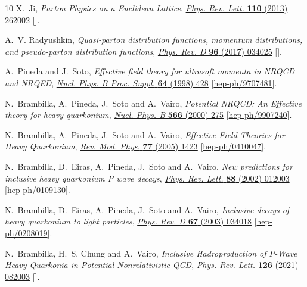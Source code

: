 \begin{thebibliography}{10}
X.~Ji, \emph{{Parton Physics on a Euclidean Lattice}},
  \href{https://doi.org/10.1103/PhysRevLett.110.262002}{\emph{Phys. Rev. Lett.}
  {\bfseries 110} (2013) 262002}
  [\href{https://arxiv.org/abs/1305.1539}{{}}].

A.~V. Radyushkin, \emph{{Quasi-parton distribution functions, momentum
  distributions, and pseudo-parton distribution functions}},
  \href{https://doi.org/10.1103/PhysRevD.96.034025}{\emph{Phys. Rev. D}
  {\bfseries 96} (2017) 034025}
  [\href{https://arxiv.org/abs/1705.01488}{{}}].

A.~Pineda and J.~Soto, \emph{{Effective field theory for ultrasoft momenta in
  NRQCD and NRQED}},
  \href{https://doi.org/10.1016/S0920-5632(97)01102-X}{\emph{Nucl. Phys. B
  Proc. Suppl.} {\bfseries 64} (1998) 428}
  [\href{https://arxiv.org/abs/hep-ph/9707481}{{\ttfamily hep-ph/9707481}}].

N.~Brambilla, A.~Pineda, J.~Soto and A.~Vairo, \emph{{Potential NRQCD: An
  Effective theory for heavy quarkonium}},
  \href{https://doi.org/10.1016/S0550-3213(99)00693-8}{\emph{Nucl. Phys. B}
  {\bfseries 566} (2000) 275}
  [\href{https://arxiv.org/abs/hep-ph/9907240}{{\ttfamily hep-ph/9907240}}].

N.~Brambilla, A.~Pineda, J.~Soto and A.~Vairo, \emph{{Effective Field Theories
  for Heavy Quarkonium}},
  \href{https://doi.org/10.1103/RevModPhys.77.1423}{\emph{Rev. Mod. Phys.}
  {\bfseries 77} (2005) 1423}
  [\href{https://arxiv.org/abs/hep-ph/0410047}{{\ttfamily hep-ph/0410047}}].

N.~Brambilla, D.~Eiras, A.~Pineda, J.~Soto and A.~Vairo, \emph{{New predictions
  for inclusive heavy quarkonium P wave decays}},
  \href{https://doi.org/10.1103/PhysRevLett.88.012003}{\emph{Phys. Rev. Lett.}
  {\bfseries 88} (2002) 012003}
  [\href{https://arxiv.org/abs/hep-ph/0109130}{{\ttfamily hep-ph/0109130}}].

N.~Brambilla, D.~Eiras, A.~Pineda, J.~Soto and A.~Vairo, \emph{{Inclusive
  decays of heavy quarkonium to light particles}},
  \href{https://doi.org/10.1103/PhysRevD.67.034018}{\emph{Phys. Rev. D}
  {\bfseries 67} (2003) 034018}
  [\href{https://arxiv.org/abs/hep-ph/0208019}{{\ttfamily hep-ph/0208019}}].

N.~Brambilla, H.~S. Chung and A.~Vairo, \emph{{Inclusive Hadroproduction of
  $P$-Wave Heavy Quarkonia in Potential Nonrelativistic QCD}},
  \href{https://doi.org/10.1103/PhysRevLett.126.082003}{\emph{Phys. Rev. Lett.}
  {\bfseries 126} (2021) 082003}
  [\href{https://arxiv.org/abs/2007.07613}{{}}].


\end{thebibliography}
